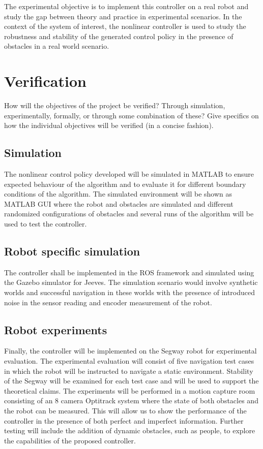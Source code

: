 \documentclass[journal]{IEEEtran}
\begin{document}
The experimental objective is to implement this controller on a real robot and study the gap between theory and practice in experimental scenarios. In the context of the system of interest, the nonlinear controller is used to study the robustness and stability of the generated control policy in the presence of obstacles in a real world scenario.

\section{Verification}
How will the objectives of the project be verified? Through
simulation, experimentally, formally, or through some combination of these?
Give specifics on how the individual objectives will be verified (in a concise
fashion).
\fi
\subsection{Simulation} 
The nonlinear control policy developed will be simulated in MATLAB to ensure expected behaviour of the algorithm and to evaluate it for different boundary conditions of the algorithm. The simulated environment will be shown as MATLAB GUI where the robot and obstacles are simulated and different randomized configurations of obstacles and several runs of the algorithm will be used to test the controller.
\subsection{Robot specific simulation}
The controller shall be implemented in the ROS framework and simulated using the Gazebo simulator for Jeeves. The simulation scenario would involve synthetic worlds and successful navigation in these worlds with the presence of introduced noise in the sensor reading and encoder measurement of the robot.

\subsection{Robot experiments}
Finally, the controller will be implemented on the Segway robot for experimental evaluation. The experimental evaluation will consist of five navigation test cases in which the robot will be instructed to navigate a static environment. Stability of the Segway will be examined for each test case and will be used to support the theoretical claims. The experiments will be performed in a motion capture room consisting of an 8 camera Optitrack system where the state of both obstacles and the robot can be measured. This will allow us to show the performance of the controller in the presence of both perfect and imperfect information. Further testing will include the addition of dynamic obstacles, such as people, to explore the capabilities of the proposed controller.



\end{document}
